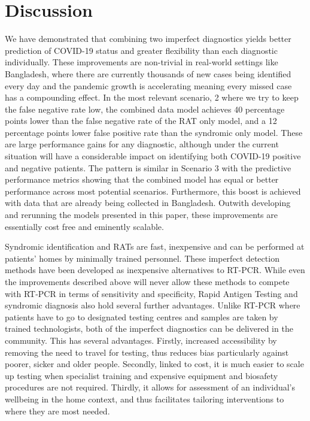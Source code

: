 \documentclass[]{elsarticle} %
\begin{document}
\hypertarget{discussion}{%
\section{Discussion}\label{discussion}}

We have demonstrated that combining two imperfect diagnostics yields
better prediction of COVID-19 status and greater flexibility than each
diagnostic individually. These improvements are non-trivial in
real-world settings like Bangladesh, where there are currently thousands
of new cases being identified every day and the pandemic growth is
accelerating meaning every missed case has a compounding effect. In the
most relevant scenario, 2 where we try to keep the false negative rate
low, the combined data model achieves 40 percentage points lower than
the false negative rate of the RAT only model, and a 12 percentage
points lower false positive rate than the syndromic only model. These
are large performance gains for any diagnostic, although under the
current situation will have a considerable impact on identifying both
COVID-19 positive and negative patients. The pattern is similar in
Scenario 3 with the predictive performance metrics showing that the
combined model has equal or better performance across most potential
scenarios. Furthermore, this boost is achieved with data that are
already being collected in Bangladesh. Outwith developing and rerunning
the models presented in this paper, these improvements are essentially
cost free and eminently scalable.

Syndromic identification and RATs are fast, inexpensive and can be
performed at patients' homes by minimally trained personnel. These
imperfect detection methods have been developed as inexpensive
alternatives to RT-PCR. While even the improvements described above will
never allow these methods to compete with RT-PCR in terms of sensitivity
and specificity, Rapid Antigen Testing and syndromic diagnosis also hold
several further advantages. Unlike RT-PCR where patients have to go to
designated testing centres and samples are taken by trained
technologists, both of the imperfect diagnostics can be delivered in the
community. This has several advantages. Firstly, increased accessibility
by removing the need to travel for testing, thus reduces bias
particularly against poorer, sicker and older people. Secondly, linked
to cost, it is much easier to scale up testing when specialist training
and expensive equipment and biosafety procedures are not required.
Thirdly, it allows for assessment of an individual's wellbeing in the
home context, and thus facilitates tailoring interventions to where they
are most needed.
\end{document}
